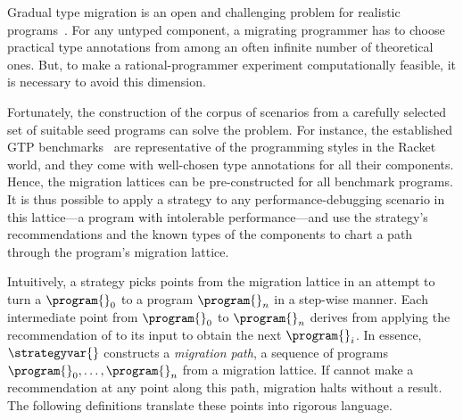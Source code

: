 \newcommand{\gtpurl}{\url{https://docs.racket-lang.org/gtp-benchmarks/index.html}}

Gradual type migration is an open and challenging problem for realistic
programs~\cite{rch:in-out-infer-gt, km:ts-type-evo,
mp:gt-decidable, ccew:gt-migrate, gc:gt-infer,
cagg-solver-based-migration,clps-popl-2020,js-infer,ruby-static-infer,unif-infer,
msi:gt-infer-hm,dyn-infer-ruby,profile-guided-typing,jstrace,gen-ts-decl,
lambdanet,nl2ptype,learn-types-big-data,ml-ts}. For
any untyped component, a migrating programmer has to choose
practical type annotations from among an often infinite number of theoretical
ones. But, to make a rational-programmer experiment computationally feasible, it
is necessary to avoid this dimension.

Fortunately, the construction of the corpus of scenarios from a carefully
selected set of suitable seed programs can solve the problem. For
instance, the established GTP
benchmarks~\cite{gtnffvf-jfp-2019,g-rep-2023} are
representative of the programming styles in the Racket world, and they
come with well-chosen type annotations for all their components.  Hence,
the migration lattices can be pre-constructed for all benchmark programs.
It is thus possible to apply a strategy to any performance-debugging
scenario in this lattice---a program with intolerable performance---and
use the strategy's recommendations and the known types of the components
to chart a path through the program's migration lattice.

Intuitively,  a strategy \strategyvar{} picks points from the migration
lattice in an attempt to turn a $\program{}_0$ to a program $\program{}_n$
in  a step-wise manner. Each intermediate point from $\program{}_0$ to
$\program{}_n$ derives from applying the recommendation of \strategyvar{}
to its input to obtain the next $\program{}_i$.  In essence,
$\strategyvar{}$ constructs a \emph{migration path}, a sequence of
programs ${\program{}_0}, \ldots, {\program{}_n}$ from a migration
lattice. If \strategyvar{} cannot make a recommendation at any point along
this path, migration halts without a result. The following
definitions translate these points into rigorous language. 

